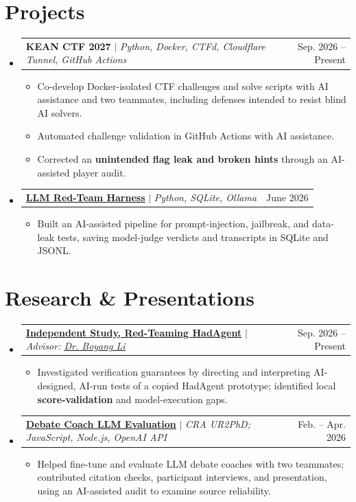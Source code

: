 \documentclass[letterpaper,11pt]{article}
\makeatletter
\newcommand{\resumeItem}[1]{
  \item\small{#1}
}
\newcommand{\resumeProjectHeading}[2]{
    \item
    \begin{tabular*}{0.97\textwidth}{l@{\extracolsep{\fill}}r}
      \small#1 & #2 \\
    \end{tabular*}\vspace{-7pt}
}
\newcommand{\resumeSubHeadingListStart}{\begin{itemize}[leftmargin=0.15in, label={}, topsep=0pt, partopsep=0pt, itemsep=0pt]\small}
\newcommand{\resumeSubHeadingListEnd}{\end{itemize}}
\newcommand{\resumeItemListStart}{\begin{itemize}[topsep=2pt, itemsep=-2pt, parsep=0pt]}
\newcommand{\resumeItemListEnd}{\end{itemize}\vspace{-6pt}}
\makeatother
\begin{document}
\section{Projects}
    \resumeSubHeadingListStart
      \resumeProjectHeading
          {\textbf{KEAN CTF 2027} $|$ \emph{Python, Docker, CTFd, Cloudflare Tunnel, GitHub Actions}}{Sep. 2026 -- Present}
          \resumeItemListStart
            \resumeItem{Co-develop Docker-isolated CTF challenges and solve scripts with AI assistance and two teammates, including defenses intended to resist blind AI solvers.}
            \resumeItem{Automated challenge validation in GitHub Actions with AI assistance.}
            \resumeItem{Corrected an \textbf{unintended flag leak and broken hints} through an AI-assisted player audit.}
          \resumeItemListEnd
      \resumeProjectHeading
          {\href{https://github.com/Vaunty/legacy-red-team-harness}{\textbf{LLM Red-Team Harness}} $|$ \emph{Python, SQLite, Ollama}}{June 2026}
          \resumeItemListStart
            \resumeItem{Built an AI-assisted pipeline for prompt-injection, jailbreak, and data-leak tests, saving model-judge verdicts and transcripts in SQLite and JSONL.}
          \resumeItemListEnd
    \resumeSubHeadingListEnd

\section{Research \& Presentations}
  \resumeSubHeadingListStart
    \resumeProjectHeading
      {\href{https://github.com/Vaunty/hadagent-verification-study}{\textbf{Independent Study, Red-Teaming HadAgent}} $|$ \emph{Advisor: \href{https://www.liboyang.org/}{\underline{Dr. Boyang Li}}}}{Sep. 2026 -- Present}
      \resumeItemListStart
        \resumeItem{Investigated verification guarantees by directing and interpreting AI-designed, AI-run tests of a copied HadAgent prototype; identified local \textbf{score-validation} and model-execution gaps.}
      \resumeItemListEnd
    \resumeProjectHeading
      {\href{https://github.com/ponzek/DebateCoach}{\textbf{Debate Coach LLM Evaluation}} $|$ \emph{CRA UR2PhD; JavaScript, Node.js, OpenAI API}}{Feb. -- Apr. 2026}
      \resumeItemListStart
        \resumeItem{Helped fine-tune and evaluate LLM debate coaches with two teammates; contributed citation checks, participant interviews, and presentation, using an AI-assisted audit to examine source reliability.}
      \resumeItemListEnd
  \resumeSubHeadingListEnd
\end{document}
